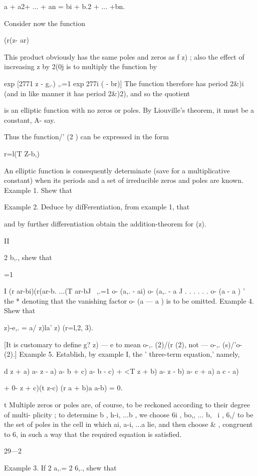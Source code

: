{a + a2+ ... + an = bi + b.2 + ... +bn.

Consider now the function

  (r(z- ar)

This product obviously has the same poles and zeros as f z) ; also the
effect of increasing z by 2(0j is to multiply the function by

  exp [2771 z - g,.) ,.=1 exp 277i ( - br)] The function therefore has
period 2\&)i (and in like manner it has period 2\&)2), and so the
quotient

is an elliptic function with no zeros or poles. By Liouville's
theorem, it must be a constant, A- say.

Thus the function/' (2 ) can be expressed in the form

r=l(T Z-b,)

An elliptic function is consequently determinate (save for a
multiplicative constant) when its periods and a set of irreducible
zeros and poles are known. Example 1. Shew that

Example 2. Deduce by difFerentiation, from example 1, that

and by further differentiation obtain the addition-theorem for (z).

II

2 b,., shew that

=1

I (r ar-bi)(r(ar-b. ...(T ar-bJ \ ,.=1 o- (a,. - ai) o- (a,. - a J . .
. . . . o- (a - a ) ' the * denoting that the vanishing factor o- (a —
a ) is to be omitted. Example 4. Shew that

  z)-e,. = a/ z)la' z) (r=l,2, 3).

[It is customary to define g? z) — e to mean o-,. (2)/(r (2), not —
o-,. (s)/'o- (2).] Example 5. Establish, by example I, the '
three-term equation,' namely,

d z + a) a- z - a) a- b + c) a- b - c) + <T z + b) a- z - b) a- c + a)
a c - a)

+ 0- z + c)(t z-c) (r a + b)a a-b) = 0.

t Multiple zeros or poles are, of course, to be reckoned according to
their degree of multi- plicity ; to determine b , h-i, ...b , we
choose 6i , bo,, ... b, \ i , 6,/ to be the set of poles in the cell
in which ai, a-i, ...a lie, and then choose \& , congruent to 6, in
such a way that the required equation is satisfied.

29—2

Example 3. If 2 a,.= 2 6,., shew that

}

